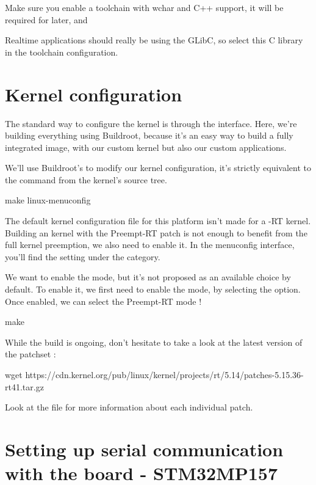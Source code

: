 Make sure you enable a toolchain with wchar and C++ support, it will be required
for later, and 

Realtime applications should really be using the GLibC, so select this C library in the
toolchain configuration.

\section{Kernel configuration}
The standard way to configure the kernel is through the  interface. Here, we're building everything using
Buildroot, because it's an easy way to build a fully integrated image, with our custom kernel but also our custom applications.

We'll use Buildroot's  to modify our kernel configuration,
it's strictly equivalent to the  command from the kernel's source tree.

\begin{bashinput}
	make linux-menuconfig
\end{bashinput}

The default kernel configuration file for this platform isn't made for a -RT kernel. Building an kernel with the Preempt-RT patch is not enough to
benefit from the full kernel preemption, we also need to enable it. In the menuconfig interface, you'll find the  setting under the  category.

We want to enable the  mode, but it's not proposed as an available choice by default. To enable it, we first need to enable the  mode, by selecting the  option. Once enabled, we can select the Preempt-RT mode !

\begin{bashinput}
make
\end{bashinput}

While the build is ongoing, don't hesitate to take a look at the latest
version of the patchset :

\begin{bashinput}
wget https://cdn.kernel.org/pub/linux/kernel/projects/rt/5.14/patches-5.15.36-rt41.tar.gz
\end{bashinput}

Look at the  file for more information about each individual patch.

\section{Setting up serial communication with the board - STM32MP157}

